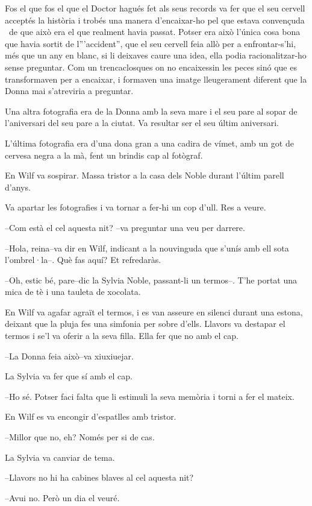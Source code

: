 Fos el que fos el que el Doctor hagués fet als seus records va fer que
el seu cervell acceptés la història i trobés una manera d'encaixar-ho
pel que estava convençuda ~de que això era el que realment havia passat.
Potser era això l'única cosa bona que havia sortit de l'''accident'',
que el seu cervell feia allò per a enfrontar-s'hi, més que un any en
blanc, si li deixaves caure una idea, ella podia racionalitzar-ho sense
preguntar. Com un trencaclosques on no encaixessin les peces sinó que es
transformaven per a encaixar, i formaven una imatge lleugerament
diferent que la Donna mai s'atreviria a preguntar.

Una altra fotografia era de la Donna amb la seva mare i el seu pare al
sopar de l'aniversari del seu pare a la ciutat. Va resultar ser el seu
últim aniversari.

L'última fotografia era d'una dona gran a una cadira de vímet, amb un
got de cervesa negra a la mà, fent un brindis cap al fotògraf.

En Wilf va sospirar. Massa tristor a la casa dels Noble durant l'últim
parell d'anys.

Va apartar les fotografies i va tornar a fer-hi un cop d'ull. Res a
veure.

--Com està el cel aquesta nit? --va preguntar una veu per darrere.

--Hola, reina--va dir en Wilf, indicant a la nouvinguda que s'unís amb
ell sota l'ombrel·la--. Què fas aquí? Et refredaràs.

--Oh, estic bé, pare--dic la Sylvia Noble, passant-li un termos--. T'he
portat una mica de tè i una tauleta de xocolata.

En Wilf va agafar agraït el termos, i es van asseure en silenci durant
una estona, deixant que la pluja fes una simfonia per sobre d'ells.
Llavors va destapar el termos i se'l va oferir a la seva filla. Ella fer
que no amb el cap.

--La Donna feia això--va xiuxiuejar.

La Sylvia va fer que sí amb el cap.

--Ho sé. Potser faci falta que li estimuli la seva memòria i torni a fer
el mateix.

En Wilf es va encongir d'espatlles amb tristor.

--Millor que no, eh? Només per si de cas.

La Sylvia va canviar de tema.

--Llavors no hi ha cabines blaves al cel aquesta nit?

--Avui no. Però un dia el veuré.

